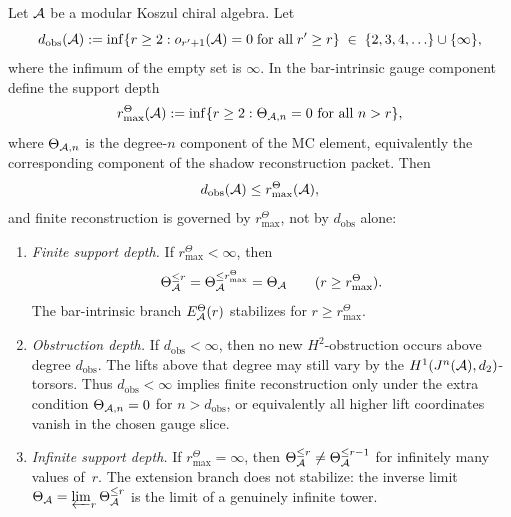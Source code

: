 \begin{theorem}
Let $\mathcal{A}$ be a modular Koszul chiral algebra. Let
\begin{equation}%
d_{\mathrm{obs}}(\cA) :=
\inf\{r \geq 2 : o_{r'+1}(\cA) = 0
\;\text{for all}\; r' \geq r\}
\;\in\; \{2, 3, 4, \ldots\} \cup \{\infty\},
\end{equation}
where the infimum of the empty set is \(\infty\).  In the
bar-intrinsic gauge component define the support depth
\[
r^\Theta_{\max}(\mathcal{A}):=
\inf\{r\ge2:\Theta_{\mathcal{A},n}=0\ \text{for all}\ n>r\},
\]
where \(\Theta_{\mathcal{A},n}\) is the degree-\(n\) component of the MC
element, equivalently the corresponding component of the shadow
reconstruction packet.  Then
\[
d_{\mathrm{obs}}(\mathcal{A})\le r^\Theta_{\max}(\mathcal{A}),
\]
and finite reconstruction is governed by \(r^\Theta_{\max}\), not by
\(d_{\mathrm{obs}}\) alone:
\begin{enumerate}[label=\textup{(\roman*)}]
\item \emph{Finite support depth.}
If \(r^\Theta_{\max}<\infty\), then
\[
\Theta_{\mathcal{A}}^{\leq r}=\Theta_{\mathcal{A}}^{\leq r^\Theta_{\max}}=\Theta_{\mathcal{A}}
\qquad (r\ge r^\Theta_{\max}).
\]
The bar-intrinsic branch \(E^\Theta_{\mathcal{A}}(r)\) stabilizes for
\(r\ge r^\Theta_{\max}\).

\item \emph{Obstruction depth.}
If \(d_{\mathrm{obs}}<\infty\), then no new \(H^2\)-obstruction occurs
above degree \(d_{\mathrm{obs}}\).  The lifts above that degree may
still vary by the \(H^1(J^n(\mathcal{A}),d_2)\)-torsors.  Thus
\(d_{\mathrm{obs}}<\infty\) implies finite reconstruction only under
the extra condition \(\Theta_{\mathcal{A},n}=0\) for \(n>d_{\mathrm{obs}}\), or
equivalently all higher lift coordinates vanish in the chosen gauge
slice.

\item \emph{Infinite support depth.}
If \(r^\Theta_{\max} = \infty\), then
$\Theta_{\mathcal{A}}^{\leq r} \neq \Theta_{\mathcal{A}}^{\leq r-1}$
for infinitely many values of~$r$. The extension
branch does not stabilize: the inverse limit
$\Theta_{\mathcal{A}} = \varprojlim_r \Theta_{\mathcal{A}}^{\leq r}$
is the limit of a genuinely infinite tower.
\end{enumerate}
\end{theorem}

